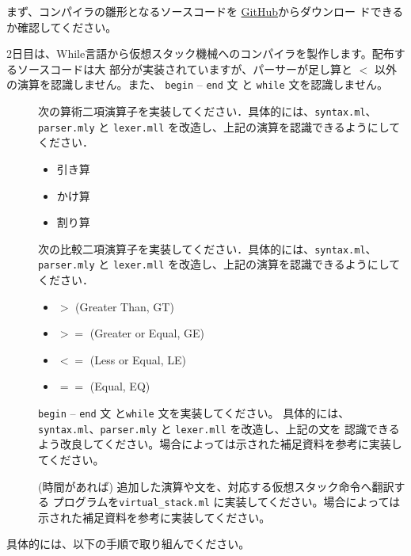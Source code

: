 \documentclass[a4paper,11pt]{jsarticle}
\begin{document}
まず、コンパイラの雛形となるソースコードを
\href{https://github.com/tmu-compiler-info-sys-exp-I/compiler-day2}{GitHub}からダウンロー
ドできるか確認してください。

2日目は、While言語から仮想スタック機械へのコンパイラを製作します。配布するソースコードは大
部分が実装されていますが、パーサーが足し算と $<$ 以外の演算を認識しません。また、
\verb|begin| -- \verb|end| 文 と \verb|while| 文を認識しません。

\begin{description}
\item [] 次の算術二項演算子を実装してください．具体的には、\verb|syntax.ml|、
  \verb|parser.mly| と \verb|lexer.mll| を改造し、上記の演算を認識できるようにしてください．
  \begin{itemize}
  \item 引き算
  \item かけ算
  \item 割り算
  \end{itemize}
\item [] 次の比較二項演算子を実装してください．具体的には、\verb|syntax.ml|、
  \verb|parser.mly| と \verb|lexer.mll| を改造し、上記の演算を認識できるようにしてください．
  \begin{itemize}
  \item $>$ (Greater Than, GT)
  \item $>=$ (Greater or Equal, GE)
  \item $<=$ (Less or Equal, LE)
  \item $==$ (Equal, EQ)
  \end{itemize}
\item [] \verb|begin| -- \verb|end| 文 と\verb|while| 文を実装してください。
  具体的には、\verb|syntax.ml|、\verb|parser.mly| と \verb|lexer.mll| を改造し、上記の文を
  認識できるよう改良してください。場合によっては示された補足資料を参考に実装してください。
\item [] (時間があれば) 追加した演算や文を、対応する仮想スタック命令へ翻訳する
  プログラムを\verb|virtual_stack.ml| に実装してください。場合によっては示された補足資料を参考に実装してください。
\end{description}

具体的には、以下の手順で取り組んでください。

\noindent{}
\end{document}

